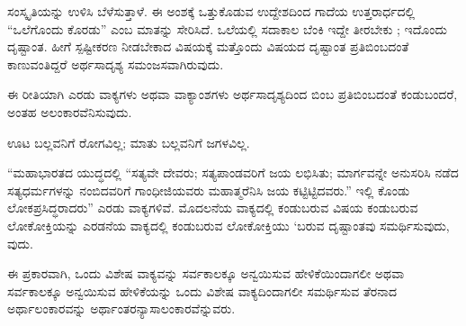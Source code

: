 \kbvcontinued ಸಂಸ್ಕೃತಿಯನ್ನು ಉಳಿಸಿ ಬೆಳೆಸುತ್ತಾಳೆ. ಈ ಅಂಶಕ್ಕೆ ಒತ್ತುಕೊಡುವ ಉದ್ದೇಶದಿಂದ ಗಾದೆಯ ಉತ್ತರಾರ್ಧದಲ್ಲಿ “ಒಲೆಗೊಂದು ಕೊರಡು” ಎಂಬ ಮಾತನ್ನು ಸೇರಿಸಿದೆ. ಒಲೆಯಲ್ಲಿ ಸದಾಕಾಲ ಬೆಂಕಿ ಇದ್ದೇ ತೀರಬೇಕು ; ಇದೊಂದು ದೃಷ್ಟಾಂತ. ಹೀಗೆ ಸ್ಪಷ್ಟೀಕರಣ ನೀಡಬೇಕಾದ ವಿಷಯಕ್ಕೆ ಮತ್ತೊಂದು ವಿಷಯದ ದೃಷ್ಟಾಂತ ಪ್ರತಿಬಿಂಬದಂತೆ ಕಾಣುವಂತಿದ್ದರೆ ಅರ್ಥಸಾದೃಶ್ಯ ಸಮಂಜಸವಾಗಿರುವುದು.\par

\indent ಈ ರೀತಿಯಾಗಿ ಎರಡು ವಾಕ್ಯಗಳು ಅಥವಾ ವಾಕ್ಯಾಂಶಗಳು ಅರ್ಥಸಾದೃಶ್ಯದಿಂದ ಬಿಂಬ ಪ್ರತಿಬಿಂಬದಂತೆ ಕಂಡುಬಂದರೆ, ಅಂತಹ ಅಲಂಕಾರವೆನಿಸುವುದು.\par

\noindent\hspace*{1.2em}\hspace{0.6em}ಊಟ ಬಲ್ಲವನಿಗೆ ರೋಗವಿಲ್ಲ; ಮಾತು ಬಲ್ಲವನಿಗೆ ಜಗಳವಿಲ್ಲ.\par


\indent “ಮಹಾಭಾರತದ ಯುದ್ಧದಲ್ಲಿ “ಸತ್ಯವೇ ದೇವರು; ಸತ್ಯಪಾಂಡವರಿಗೆ ಜಯ ಲಭಿಸಿತು; ಮಾರ್ಗವನ್ನೇ ಅನುಸರಿಸಿ ನಡೆದ ಸತ್ಯಧರ್ಮಗಳನ್ನು ನಂಬಿದವರಿಗೆ ಗಾಂಧೀಜಿಯವರು ಮಹಾತ್ಮರೆನಿಸಿ ಜಯ ಕಟ್ಟಿಟ್ಟಿದವರು.” ಇಲ್ಲಿ ಕೊಂಡು ಲೋಕಪ್ರಸಿದ್ಧರಾದರು” ಎರಡು ವಾಕ್ಯಗಳಿವೆ. ಮೊದಲನೆಯ ವಾಕ್ಯದಲ್ಲಿ ಕಂಡುಬರುವ ವಿಷಯ ಕಂಡುಬರುವ ಲೋಕೋಕ್ತಿಯನ್ನು ಎರಡನೆಯ ವಾಕ್ಯದಲ್ಲಿ ಕಂಡುಬರುವ ಲೋಕೋಕ್ತಿಯು `ಬರುವ ದೃಷ್ಟಾಂತವು ಸಮರ್ಥಿಸುವುದು, ವುದು.\par

\indent ಈ ಪ್ರಕಾರವಾಗಿ, ಒಂದು ವಿಶೇಷ ವಾಕ್ಯವನ್ನು ಸರ್ವಕಾಲಕ್ಕೂ ಅನ್ವಯಿಸುವ ಹೇಳಿಕೆಯಿಂದಾಗಲೀ ಅಥವಾ ಸರ್ವಕಾಲಕ್ಕೂ ಅನ್ವಯಿಸುವ ಹೇಳಿಕೆಯನ್ನು ಒಂದು ವಿಶೇಷ ವಾಕ್ಯದಿಂದಾಗಲೀ ಸಮರ್ಥಿಸುವ ತೆರನಾದ ಅರ್ಥಾಲಂಕಾರವನ್ನು ಅರ್ಥಾಂತರನ್ಯಾಸಾಲಂಕಾರವೆನ್ನುವರು.\par
